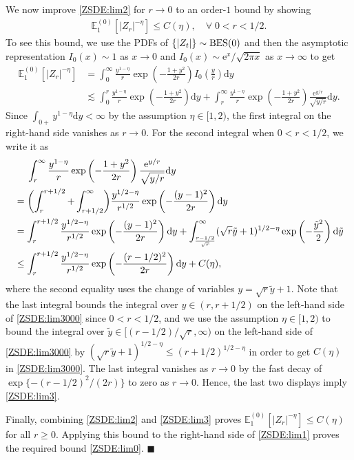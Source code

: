 \documentclass[12pt, twoside]{article}
\numberwithin{figure}{section}
\newcommand{\BES}{{\rm BES}}
\newcommand{\less}{\lesssim}
\newcommand{\e}{{\mathrm e}}
\newcommand{\1}{\mathds 1}
\newcommand{\E}{{\mathbb E}}
\renewcommand{\d}{{\mathrm d}}
\newcommand{\2}{{\mathbf 1}}
\renewenvironment{proof}[1][\proofname]{\noindent {\bfseries #1.}\;}{\hfill\ensuremath{\blacksquare}\\}
\begin{document}
\begin{proof}
We now improve \eqref{ZSDE:lim2} for $r\to 0$ to an order-$1$ bound 
by showing
\begin{align}\label{ZSDE:lim3}
\E^{(0)}_{1}[|Z_r|^{-\eta}]\leq C(\eta),\quad \forall\; 0<r<1/2.
\end{align}
To see this bound, we use the PDFs of $\{|Z_t|\}\sim \BES(0)$ \cite[p.446]{RY}
and then the asymptotic representation $I_0(x)\sim 1$ as $x\to 0$ and $I_0(x)\sim \e^x/\sqrt{2\pi x}$ as $x\to\infty$ \cite[p.136]{Lebedev} to get
\begin{align*}
\E^{(0)}_{1}[|Z_r|^{-\eta}]&=\int_0^\infty \frac{y^{1-\eta}}{r}\exp\left(-\frac{1+y^2}{2r}\right)I_{0}\left(\frac{y}{r}\right)\d y\\
&\less \int_0^r\frac{y^{1-\eta}}{r}\exp\left(-\frac{1+y^2}{2r}\right)\d y+\int_r^\infty \frac{y^{1-\eta}}{r}\exp\left(-\frac{1+y^2}{2r}\right)\frac{\e^{y/r}}{\sqrt{y/r}}\d y.
\end{align*}
Since $\int_{0+}y^{1-\eta}\d y<\infty$ by the assumption $\eta\in [1,2)$, the first integral on the right-hand side vanishes as $r\to 0$. For the second integral when $0<r<1/2$, we write it as
\begin{align}
&\quad\;\int_r^\infty \frac{y^{1-\eta}}{r}\exp\left(-\frac{1+y^2}{2r}\right)\frac{\e^{y/r}}{\sqrt{y/r}}\d y\notag\\
&=\biggl(\int_r^{r+1/2}+\int_{r+1/2}^\infty\biggr) \frac{y^{1/2-\eta}}{r^{1/2}}\exp\left(-\frac{(y-1)^2}{2r}\right)\d y\notag\\
&=\int_r^{r+1/2} \frac{y^{1/2-\eta}}{r^{1/2}}\exp\left(-\frac{(y-1)^2}{2r}\right)\d y+
\int_{\frac{r-1/2}{\sqrt{r}}}^\infty (\sqrt{r}\tilde{y}+1)^{1/2-\eta}\exp\left(-\frac{\tilde{y}^2}{2}\right)\d \tilde{y}\notag\\
&\leq \int_r^{r+1/2} \frac{y^{1/2-\eta}}{r^{1/2}}\exp\left(-\frac{(r-1/2)^2}{2r}\right)\d y+
C(\eta),\label{ZSDE:lim3000}
\end{align}
where the second equality uses the change of variables $y=\sqrt{r}\tilde{y}+1$. 
Note that the last integral bounds the integral over $y\in (r,r+1/2)$ on the left-hand side of \eqref{ZSDE:lim3000}
since $0<r<1/2$, and we use the assumption $\eta\in [1,2)$ to bound the integral over $\tilde{y}\in [(r-1/2)/\sqrt{r},\infty)$ on the left-hand side of \eqref{ZSDE:lim3000} by $(\sqrt{r}\tilde{y}+1)^{1/2-\eta}\leq (r+1/2)^{1/2-\eta}$ in order to get $C(\eta)$ in \eqref{ZSDE:lim3000}.
The last integral vanishes as $r\to 0$ by  the fast decay of $\exp\{-(r-1/2)^2/(2r)\}$ to zero as $r\to 0$. Hence, the last two displays imply \eqref{ZSDE:lim3}.

Finally, combining  \eqref{ZSDE:lim2} and \eqref{ZSDE:lim3} proves $\E^{(0)}_1[|Z_r|^{-\eta}]\leq C(\eta)$ for all $r\geq 0$. Applying this bound to the right-hand side of \eqref{ZSDE:lim1} proves the required bound 
\eqref{ZSDE:lim0}.
\end{proof}
\end{document}
